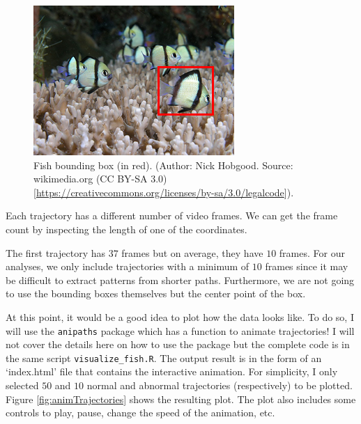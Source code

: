 \documentclass[
  11pt,
]{krantz}
\newenvironment{Shaded}{\begin{snugshade}}{\end{snugshade}}
\newcommand{\CommentTok}[1]{\textcolor[rgb]{0.37,0.37,0.37}{\textit{#1}}}
\newcommand{\FunctionTok}[1]{\textcolor[rgb]{0,0,0}{#1}}
\newcommand{\NormalTok}[1]{#1}
\newcommand{\SpecialCharTok}[1]{\textcolor[rgb]{0,0,0}{#1}}
\begin{document}
\begin{figure}

{\centering \includegraphics[width=0.4\linewidth]{images/bounding_box} 

}

\caption{Fish bounding box (in red). (Author: Nick Hobgood. Source: wikimedia.org (CC BY-SA 3.0) {[}\url{https://creativecommons.org/licenses/by-sa/3.0/legalcode}{]}).}\label{fig:fishBox}
\end{figure}

Each trajectory has a different number of video frames. We can get the frame count by inspecting the length of one of the coordinates.

\begin{Shaded}
\end{Shaded}

The first trajectory has \(37\) frames but on average, they have \(10\) frames. For our analyses, we only include trajectories with a minimum of \(10\) frames since it may be difficult to extract patterns from shorter paths. Furthermore, we are not going to use the bounding boxes themselves but the center point of the box.

At this point, it would be a good idea to plot how the data looks like. To do so, I will use the \texttt{anipaths} package \citep{anipaths} which has a function to animate trajectories! I will not cover the details here on how to use the package but the complete code is in the same script \texttt{visualize\_fish.R}. The output result is in the form of an `index.html' file that contains the interactive animation. For simplicity, I only selected \(50\) and \(10\) normal and abnormal trajectories (respectively) to be plotted. Figure \ref{fig:animTrajectories} shows the resulting plot. The plot also includes some controls to play, pause, change the speed of the animation, etc.
\end{document}

